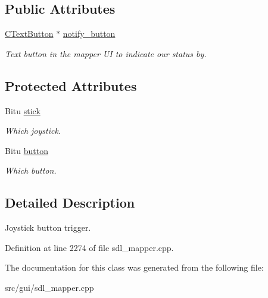 \subsection*{Public Attributes}
\begin{DoxyCompactItemize}
\item 
\hypertarget{classCJButtonEvent_ac8c89511fdc9a86b4c187eec432445d2}{\hyperlink{classCTextButton}{C\-Text\-Button} $\ast$ \hyperlink{classCJButtonEvent_ac8c89511fdc9a86b4c187eec432445d2}{notify\-\_\-button}}\label{classCJButtonEvent_ac8c89511fdc9a86b4c187eec432445d2}

\begin{DoxyCompactList}\small\item\em Text button in the mapper U\-I to indicate our status by. \end{DoxyCompactList}\end{DoxyCompactItemize}
\subsection*{Protected Attributes}
\begin{DoxyCompactItemize}
\item 
\hypertarget{classCJButtonEvent_aa87062af5d8bc5db801066e2eb4a74f8}{Bitu \hyperlink{classCJButtonEvent_aa87062af5d8bc5db801066e2eb4a74f8}{stick}}\label{classCJButtonEvent_aa87062af5d8bc5db801066e2eb4a74f8}

\begin{DoxyCompactList}\small\item\em Which joystick. \end{DoxyCompactList}\item 
\hypertarget{classCJButtonEvent_abdbfaa23915b89b1392129c9525dd58d}{Bitu \hyperlink{classCJButtonEvent_abdbfaa23915b89b1392129c9525dd58d}{button}}\label{classCJButtonEvent_abdbfaa23915b89b1392129c9525dd58d}

\begin{DoxyCompactList}\small\item\em Which button. \end{DoxyCompactList}\end{DoxyCompactItemize}


\subsection{Detailed Description}
Joystick button trigger. 

Definition at line 2274 of file sdl\-\_\-mapper.\-cpp.



The documentation for this class was generated from the following file\-:\begin{DoxyCompactItemize}
\item 
src/gui/sdl\-\_\-mapper.\-cpp\end{DoxyCompactItemize}
